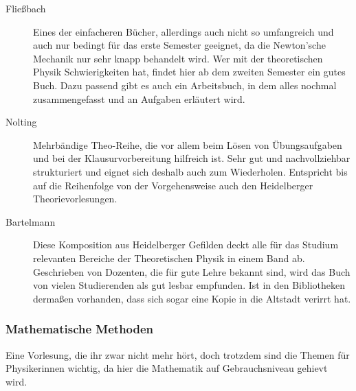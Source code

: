 \begin{description}
\item[Fließbach]{
		Eines der einfacheren Bücher, allerdings auch nicht so umfangreich und auch nur bedingt für das erste Semester geeignet, da die Newton'sche Mechanik nur sehr knapp behandelt wird. Wer mit der theoretischen Physik Schwierigkeiten hat, findet hier ab dem zweiten Semester ein gutes Buch. Dazu passend gibt es auch ein Arbeitsbuch, in dem alles nochmal zusammengefasst und an Aufgaben erläutert wird.}

\item[Nolting]{
		Mehrbändige Theo-Reihe, die vor allem beim Lösen von Übungsaufgaben und bei der Klausurvorbereitung hilfreich ist. Sehr gut und nachvollziehbar strukturiert und eignet sich deshalb auch zum Wiederholen. Entspricht bis auf die Reihenfolge von der Vorgehensweise auch den Heidelberger Theorievorlesungen.}

\item[Bartelmann]{
		Diese Komposition aus Heidelberger Gefilden deckt alle für das Studium relevanten Bereiche der Theoretischen Physik in einem Band ab. Geschrieben von Dozenten, die für gute Lehre bekannt sind, wird das Buch von vielen Studierenden als gut lesbar empfunden. Ist in den Bibliotheken dermaßen vorhanden, dass sich sogar eine Kopie in die Altstadt verirrt hat.}
\end{description}

\vspace{-4mm}

\subsubsection{Mathematische Methoden}

Eine Vorlesung, die ihr zwar nicht mehr hört, doch trotzdem sind die Themen für Physikerinnen wichtig, da hier die Mathematik auf Gebrauchsniveau gehievt wird.

